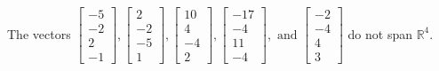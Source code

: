 \begin{exercise}
\begin{exerciseStatement}
  \end{exerciseStatement}
  \begin{exerciseAnswer}
   The vectors \(\left[\begin{array}{r}
-5 \\
-2 \\
2 \\
-1
\end{array}\right] , \left[\begin{array}{r}
2 \\
-2 \\
-5 \\
1
\end{array}\right] , \left[\begin{array}{r}
10 \\
4 \\
-4 \\
2
\end{array}\right] , \left[\begin{array}{r}
-17 \\
-4 \\
11 \\
-4
\end{array}\right] , \text{ and } \left[\begin{array}{r}
-2 \\
-4 \\
4 \\
3
\end{array}\right]\) 
  	 do not  
	span \(\mathbb{R}^4\).
  


  \end{exerciseAnswer}
\end{exercise}